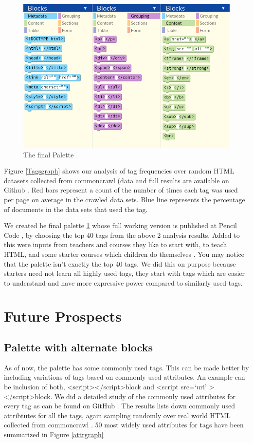 \documentclass[conference]{IEEEtran}
\begin{document}
\begin{figure}
\centering
\includegraphics[width=5in]{Palette.png}
\caption{The final Palette}
\label{paletteimage}
\end{figure}

Figure \ref{Tagsgraph} shows our analysis of tag frequencies over random HTML datasets collected from commoncrawl \cite{commoncrawl} (data and full results are available on Github \cite{FullResults}.  Red bars represent a count of the number of times each tag was used per page on average in the crawled data sets. Blue line represents the percentage of documents in the data sets that used the tag.

We created he final palette \ref{paletteimage} whose full working version is published at Pencil Code \cite{pencilcodehtml}, by choosing the top 40 tags from the above 2 analysis results. Added to this were inputs from teachers and courses they like to start with, to teach HTML, and some starter courses which children do themselves \cite{htmltutor1} \cite{htmltutor2} \cite{htmltutor3}. You may notice that the palette isn't exactly the top 40 tags. We did this on purpose because starters need not learn all highly used tags, they start with tags which are easier to understand and have more expressive power compared to similarly used tags.

\section{Future Prospects}

\subsection{Palette with alternate blocks}
As of now, the palette has some commonly used tags. This can be made better by including variations of tags based on commonly used attributes. An example can be inclusion of both, \textless script\textgreater \textless /script\textgreater block and \textless script src=`uri' \textgreater \textless/script\textgreater block. We did a detailed study of the commonly used attributes for every tag as can be found on GitHub \cite{FullResults}. The results lists down commonly used attribtutes for all the tags, again sampling randomly over real world HTML collected from commoncrawl \cite{commoncrawl}. 50 most widely used attributes for tags have been summarized in Figure \ref{attrgraph}
\end{document}
